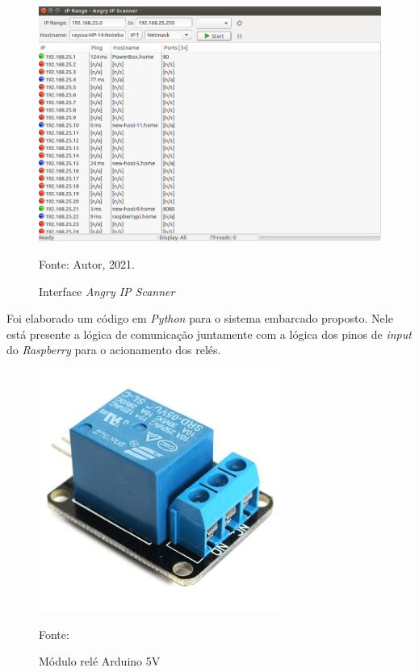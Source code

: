 \documentclass[
12pt,
openany, %
oneside, %
a4paper,			
english,			
brazil			        %
]{abntbibufjf}
\begin{document}
	\begin{figure}[!htb]
		\centering
		\includegraphics[scale=0.4]{Figuras/angryIP.png}
		\caption{Interface \textit{Angry IP Scanner}}
		\label{angryIP}
		\par Fonte: Autor, 2021.
	\end{figure}
	
    Foi elaborado um código em \textit{Python} para o sistema embarcado proposto. Nele está presente a lógica de comunicação juntamente com a lógica dos pinos de \textit{input} do \textit{Raspberry} para o acionamento dos relés.
    
    \begin{figure}[!htb]
		\centering
		\includegraphics[scale=0.5]{Figuras/Modulo-rel-5V-DC-per-Arduino-e-Raspberry-Pi.jpg}
		\caption{Módulo relé Arduino 5V}
		\label{rele}
		\par Fonte: \cite{ROBOT}
	\end{figure}
    
\end{document}

